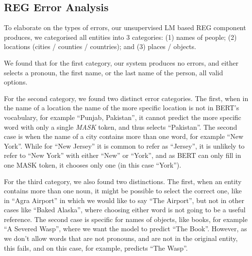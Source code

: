 \subsection{REG Error Analysis}
To elaborate on the types of errors, our unsupervised LM based REG component produces, we categorised all entities into 3 categories: (1) names of people; (2) locations (cities / counties / countries); and (3) places / objects.

We found that for the first category, our system produces no errors, and either selects a pronoun, the first name, or the last name of the person, all valid options.

For the second category, we found two distinct error categories. The first, when in the name of a location the name of the more specific location is not in BERT's vocabulary, for example ``Punjab, Pakistan'', it cannot predict the more specific word with only a single \emph{MASK} token, and thus selects ``Pakistan''. The second case is when the name of a city contains more than one word, for example ``New York''. While for ``New Jersey'' it is common to refer as ``Jersey'', it is unlikely to refer to ``New York'' with either ``New'' or ``York'', and as BERT can only fill in one MASK token, it chooses only one (in this case ``York'').

For the third category, we also found two distinctions. The first, when an entity contains more than one noun, it might be possible to select the correct one, like in ``Agra Airport'' in which we would like to say ``The Airport'', but not in other cases like ``Baked Alaska'', where choosing either word is not going to be a useful reference. 
The second case is specific for names of objects, like books, for example ``A Severed Wasp'', where we want the model to predict ``The Book''. However, as we don't allow words that are not pronouns, and are not in the original entity, this fails, and on this case, for example, predicts ``The Wasp''.

